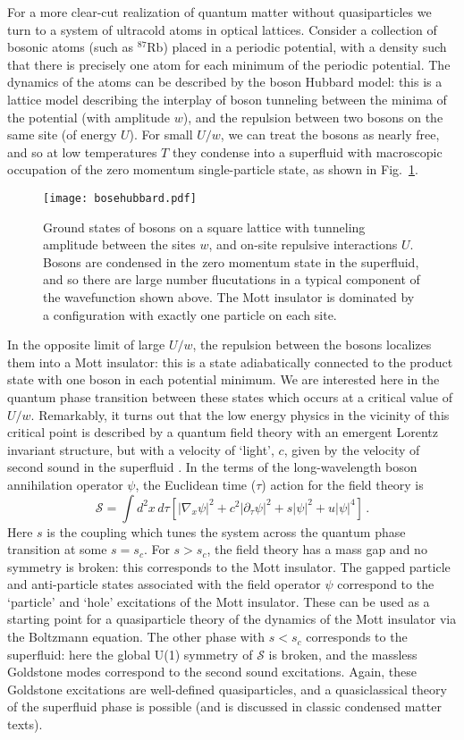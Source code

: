 \documentclass[10pt, oneside]{book}
\def\be{\begin{equation}}
\def\ee{\end{equation}}
\begin{document}
\begin{doublespace}
For a more clear-cut realization of quantum matter without quasiparticles we turn to a system of ultracold atoms in optical lattices. 
Consider a collection of bosonic atoms (such as $^{87}$Rb) placed in a periodic potential, with a density such that there is precisely 
one atom for each minimum of the periodic potential. The dynamics of the atoms can be described by the boson Hubbard model:
this is a lattice model describing the interplay of boson tunneling between the minima of the potential (with amplitude $w$),
and the repulsion between two bosons on the same site (of energy $U$). For small $U/w$, we can treat the bosons as nearly free, 
and so at low temperatures $T$ they condense into a superfluid with macroscopic occupation of the zero momentum single-particle state, as shown in Fig.~\ref{fig:bosehubbard}.
\begin{figure}
\centering
\texttt{[image: bosehubbard.pdf]}
\caption{\label{fig:bosehubbard} Ground states of bosons on a square lattice with tunneling amplitude between the sites $w$, 
and on-site repulsive interactions $U$. Bosons are condensed in the zero momentum state in the superfluid, and so there are large number
flucutations in a typical component of the wavefunction shown above. The Mott insulator is dominated by a configuration with exactly one particle
on each site.}
\end{figure}
In the opposite limit of large $U/w$, the repulsion between the bosons localizes them into a Mott insulator: this is a state adiabatically
connected to the product state with one boson in each potential minimum. We are interested here in the quantum phase transition between these
states which occurs at a critical value of $U/w$. Remarkably, it turns out that the low energy physics in the vicinity of this critical point
is described by a quantum field theory with an emergent Lorentz invariant structure, but with a velocity of `light', $c$, given by the velocity
of second sound in the superfluid \cite{ssbook,FWGF}. In the terms of the long-wavelength boson annihilation operator $\psi$, the Euclidean time ($\tau$) 
action for the field theory is 
\be
\mathcal{S} = \int d^2 x \, d\tau \left[ |\nabla_x \psi |^2 + c^2 |\partial_\tau \psi |^2 + s |\psi|^2 + u |\psi|^4 \right] \,. \label{Swf}
\ee
Here $s$ is the coupling which tunes the system across the quantum phase transition at some $s=s_c$. For $s > s_c$, the field theory
has a mass gap and no symmetry is broken: this corresponds to the Mott insulator. The gapped particle and anti-particle states associated with the 
field operator $\psi$ correspond to the `particle' and `hole' excitations of the Mott insulator. These can be used as a starting point
for a quasiparticle theory of the dynamics of the Mott insulator via the Boltzmann equation. 
The other phase with $s<s_c$ corresponds to the superfluid: here the global U(1) symmetry of $\mathcal{S}$ is broken, 
and the massless Goldstone modes correspond to the second sound excitations. Again, these Goldstone excitations are well-defined quasiparticles,
and a quasiclassical theory of the superfluid phase is possible (and is discussed in classic condensed matter texts). 


\end{doublespace}
\end{document}
